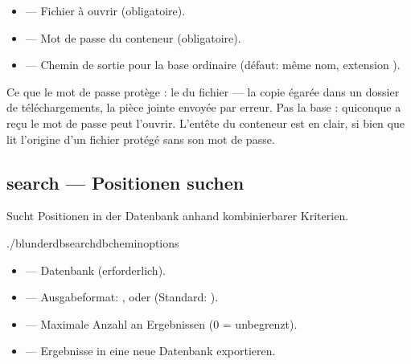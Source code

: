 \documentclass[letterpaper,10pt,german]{sphinxmanual}
\begin{document}
\sphinxAtStartPar
{}
\begin{itemize}
\item {} 
\sphinxAtStartPar
{} — Fichier  à ouvrir (obligatoire).

\item {} 
\sphinxAtStartPar
{} — Mot de passe du conteneur (obligatoire).

\item {} 
\sphinxAtStartPar
{} — Chemin de sortie pour la base ordinaire (défaut: même nom,
extension ).

\end{itemize}

\sphinxAtStartPar
Ce que le mot de passe protège : le  du fichier — la copie égarée
dans un dossier de téléchargements, la pièce jointe envoyée par erreur. Pas la
base : quiconque a reçu le mot de passe peut l’ouvrir. L’en\sphinxhyphen{}tête du conteneur
est en clair, si bien que  lit l’origine d’un fichier
protégé sans son mot de passe.


\subsection{search — Positionen suchen}
\label{\detokenize{cli:search-rechercher-des-positions}}
\sphinxAtStartPar
Sucht Positionen in der Datenbank anhand kombinierbarer Kriterien.

\begin{sphinxVerbatim}[commandchars=\\\{\}]
./blunderdbsearch\PYGZhy{}\PYGZhy{}db\PYGZlt{}chemin\PYGZgt{}\PYG{o}{[}options\PYG{o}{]}
\end{sphinxVerbatim}

\sphinxAtStartPar
{}
\begin{itemize}
\item {} 
\sphinxAtStartPar
{} — Datenbank (erforderlich).

\item {} 
\sphinxAtStartPar
{} — Ausgabeformat: ,  oder  (Standard: ).

\item {} 
\sphinxAtStartPar
{} — Maximale Anzahl an Ergebnissen (0 = unbegrenzt).

\item {} 
\sphinxAtStartPar
{} — Ergebnisse in eine neue Datenbank exportieren.

\end{itemize}
\end{document}

